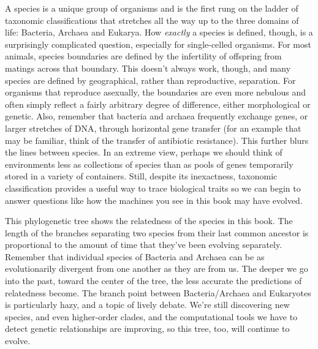 \documentclass[]{tufte-book}
\begin{document}
A species is a unique group of organisms and is the first rung on the ladder of taxonomic classifications that stretches all the way up to the three domains of life: Bacteria, Archaea and Eukarya. How \emph{exactly} a species is defined, though, is a surprisingly complicated question, especially for single-celled organisms. For most animals, species boundaries are defined by the infertility of offspring from matings across that boundary. This doesn't always work, though, and many species are defined by geographical, rather than reproductive, separation. For organisms that reproduce asexually, the boundaries are even more nebulous and often simply reflect a fairly arbitrary degree of difference, either morphological or genetic. Also, remember that bacteria and archaea frequently exchange genes, or larger stretches of DNA, through horizontal gene transfer (for an example that may be familiar, think of the transfer of antibiotic resistance). This further blurs the lines between species. In an extreme view, perhaps we should think of environments less as collections of species than as pools of genes temporarily stored in a variety of containers. Still, despite its inexactness, taxonomic classification provides a useful way to trace biological traits so we can begin to answer questions like how the machines you see in this book may have evolved.

This phylogenetic tree shows the relatedness of the species in this book. The length of the branches separating two species from their last common ancestor is proportional to the amount of time that they've been evolving separately. Remember that individual species of Bacteria and Archaea can be as evolutionarily divergent from one another as they are from us. The deeper we go into the past, toward the center of the tree, the less accurate the predictions of relatedness become. The branch point between Bacteria/Archaea and Eukaryotes is particularly hazy, and a topic of lively debate. We're still discovering new species, and even higher-order clades, and the computational tools we have to detect genetic relationships are improving, so this tree, too, will continue to evolve.
\end{document}
